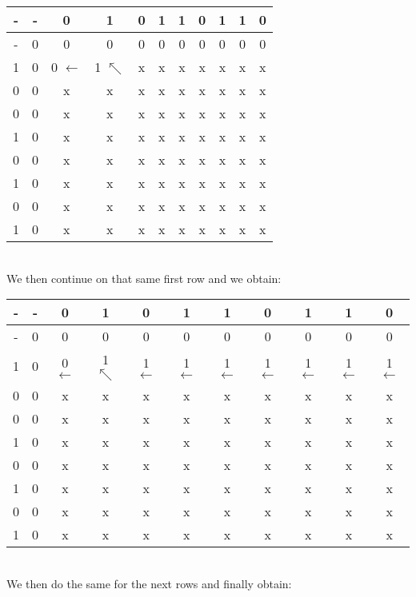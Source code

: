 \documentclass[11pt]{article}
\begin{document}
\begin{enumerate}
\begin{tabular}{ c | c c c c c c c c c c }
        - & - & 0 & 1 & 0 & 1 & 1 & 0 & 1 & 1 & 0 \\
        \hline
        - & 0 & 0 & 0 & 0 & 0 & 0 & 0 & 0 & 0 & 0 \\
        1 & 0 & 0 $\leftarrow$ & 1 $\nwarrow$ & x & x & x & x & x & x & x \\
        0 & 0 & x & x & x & x & x & x & x & x & x \\
        0 & 0 & x & x & x & x & x & x & x & x & x \\
        1 & 0 & x & x & x & x & x & x & x & x & x \\
        0 & 0 & x & x & x & x & x & x & x & x & x \\
        1 & 0 & x & x & x & x & x & x & x & x & x \\
        0 & 0 & x & x & x & x & x & x & x & x & x \\
        1 & 0 & x & x & x & x & x & x & x & x & x \\
    \end{tabular}
    \\ We then continue on that same first row and we obtain: \\
    \begin{tabular}{ c | c c c c c c c c c c } 
        - & - & 0 & 1 & 0 & 1 & 1 & 0 & 1 & 1 & 0 \\
        \hline
        - & 0 & 0 & 0 & 0 & 0 & 0 & 0 & 0 & 0 & 0 \\
        1 & 0 & 0 $\leftarrow$ & 1 $\nwarrow$ & 1 $\leftarrow$ & 1 $\leftarrow$ & 1 $\leftarrow$ & 1 $\leftarrow$ & 1 $\leftarrow$ & 1 $\leftarrow$ & 1 $\leftarrow$ \\
        0 & 0 & x & x & x & x & x & x & x & x & x \\
        0 & 0 & x & x & x & x & x & x & x & x & x \\
        1 & 0 & x & x & x & x & x & x & x & x & x \\
        0 & 0 & x & x & x & x & x & x & x & x & x \\
        1 & 0 & x & x & x & x & x & x & x & x & x \\
        0 & 0 & x & x & x & x & x & x & x & x & x \\
        1 & 0 & x & x & x & x & x & x & x & x & x \\
    \end{tabular}
    \\ We then do the same for the next rows and finally obtain: \\
    \begin{tabular}{ c | c c c c c c c c c c } 

\end{tabular}
\end{enumerate}
\end{document}
